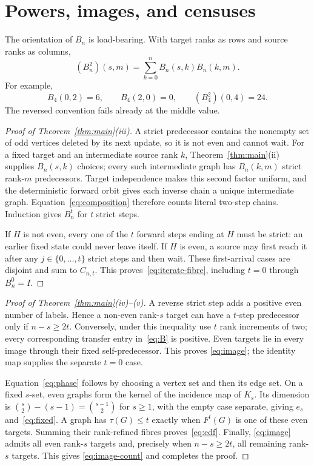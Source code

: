 \documentclass[a4paper,10pt]{amsart}
\theoremstyle{remark}
\begin{document}
\section{Powers, images, and censuses}\label{sec:atlas}

The orientation of $B_n$ is load-bearing.  With target ranks as rows and
source ranks as columns,
\begin{equation}\label{eq:composition}
 (B_n^2)(s,m)=\sum_{k=0}^n B_n(s,k)B_n(k,m).
\end{equation}
For example,
\[
 B_4(0,2)=6,\qquad B_4(2,0)=0,\qquad (B_4^2)(0,4)=24.
\]
The reversed convention fails already at the middle value.

\begin{proof}[Proof of Theorem~\ref{thm:main}(iii)]
A strict predecessor contains the nonempty set of odd vertices deleted by its
next update, so it is not even and cannot wait.  For a fixed target and an
intermediate source rank $k$, Theorem~\ref{thm:main}(ii) supplies
$B_n(s,k)$ choices; every such intermediate graph has $B_n(k,m)$ strict
rank-$m$ predecessors.  Target independence makes this second factor uniform,
and the deterministic forward orbit gives each inverse chain a unique
intermediate graph.  Equation~\eqref{eq:composition} therefore counts literal
two-step chains.  Induction gives $B_n^t$ for $t$ strict steps.

If $H$ is not even, every one of the $t$ forward steps ending at $H$ must be
strict: an earlier fixed state could never leave itself.  If $H$ is even, a
source may first reach it after any $j\in\{0,\ldots,t\}$ strict steps and then
wait.  These first-arrival cases are disjoint and sum to $C_{n,t}$.  This
proves~\eqref{eq:iterate-fibre}, including $t=0$ through $B_n^0=I$.
\end{proof}

\begin{proof}[Proof of Theorem~\ref{thm:main}(iv)--(v)]
A reverse strict step adds a positive even number of labels.  Hence a
non-even rank-$s$ target can have a $t$-step predecessor only if $n-s\geq2t$.
Conversely, under this inequality use $t$ rank increments of two; every
corresponding transfer entry in~\eqref{eq:B} is positive.  Even targets lie
in every image through their fixed self-predecessor.  This proves
\eqref{eq:image}; the identity map supplies the separate $t=0$ case.

Equation~\eqref{eq:phase} follows by choosing a vertex set and then its edge
set.  On a fixed $s$-set, even graphs form the kernel of the incidence map of
$K_s$.  Its dimension is $\binom s2-(s-1)=\binom{s-1}{2}$ for $s\geq1$,
with the empty case separate, giving $e_s$ and~\eqref{eq:fixed}.  A graph has
$\tau(G)\leq t$ exactly when $F^t(G)$ is one of these even targets.  Summing
their rank-refined fibres proves~\eqref{eq:cdf}.  Finally,
\eqref{eq:image} admits all even rank-$s$ targets and, precisely when
$n-s\geq2t$, all remaining rank-$s$ targets.  This gives
\eqref{eq:image-count} and completes the proof.
\end{proof}
\end{document}
